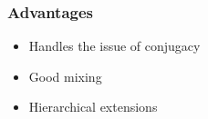 \begin{frame} %
	\frametitle{Advantages}

	\begin{itemize}
	     \item Handles the issue of conjugacy

	    \item Good mixing %

	    \item Hierarchical extensions
	\end{itemize}

\end{frame}


